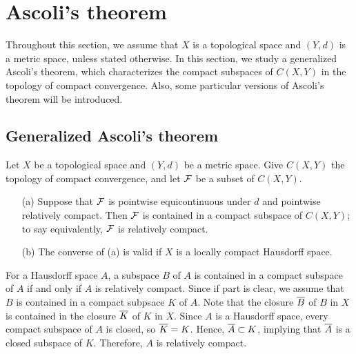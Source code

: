 \section{Ascoli's theorem}

Throughout this section, we assume that $X$ is a topological space and $(Y, d)$ is a metric space, unless stated otherwise.
In this section, we study a generalized Ascoli's theorem, which characterizes the compact subspaces of $C(X, Y)$ in the topology of compact convergence.
Also, some particular versions of Ascoli's theorem will be introduced.

\subsection{Generalized Ascoli's theorem}

\begin{thm}
    Let $X$ be a topological space and $(Y, d)$ be a metric space.
    Give $C(X, Y)$ the topology of compact convergence, and let ${\mathcal{F}}$ be a subset of $C(X, Y)$.
    \begin{enumerate}
        \item[(a)]
        {
            Suppose that ${\mathcal{F}}$ is pointwise equicontinuous under $d$ and pointwise relatively compact.
            Then ${\mathcal{F}}$ is contained in a compact subspace of $C(X, Y)$; to say equivalently, ${\mathcal{F}}$ is relatively compact.
        }
        \item[(b)]
        {
            The converse of (a) is valid if $X$ is a locally compact Hausdorff space.
        }
    \end{enumerate}
\end{thm}
\begin{rmk}
    For a Hausdorff space $A$, a subspace $B$ of $A$ is contained in a compact subspace of $A$ if and only if $A$ is relatively compact.
    Since if part is clear, we assume that $B$ is contained in a compact subpsace $K$ of $A$.
    Note that the closure $\overline{B}$ of $B$ in $X$ is contained in the closure $\overline{K}$ of $K$ in $X$.
    Since $A$ is a Hausdorff space, every compact subspace of $A$ is closed, so $\overline{K}=K$.
    Hence, $\overline{A}\subset K$, implying that $\overline{A}$ is a closed subspace of $K$.
    Therefore, $A$ is relatively compact.
\end{rmk}

